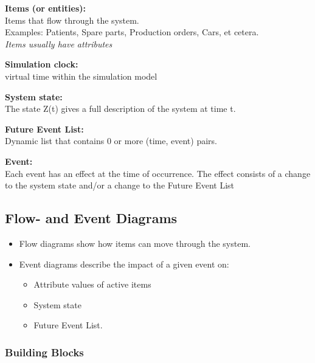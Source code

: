 \textbf{Items (or entities):}\\
Items that flow through the system.\\
Examples: Patients, Spare parts, Production orders, Cars, et cetera.\\
\emph{Items usually have attributes}

\textbf{Simulation clock:}\\
virtual time within the simulation model

\textbf{System state:}\\
The state Z(t) gives a full description of the system at time t.

\textbf{Future Event List:}\\
Dynamic list that contains 0 or more (time, event) pairs.

\textbf{Event:}\\
Each event has an effect at the time of occurrence. The effect consists
of a change to the system state and/or a change to the Future Event List

\hypertarget{flow--and-event-diagrams}{%
\subsection{Flow- and Event Diagrams}\label{flow--and-event-diagrams}}

\begin{itemize}
\item
  Flow diagrams show how items can move through the system.
\item
  Event diagrams describe the impact of a given event on:

  \begin{itemize}
  \tightlist
  \item
    Attribute values of active items
  \item
    System state
  \item
    Future Event List.
  \end{itemize}
\end{itemize}

\hypertarget{building-blocks}{%
\subsubsection{Building Blocks}\label{building-blocks}}

